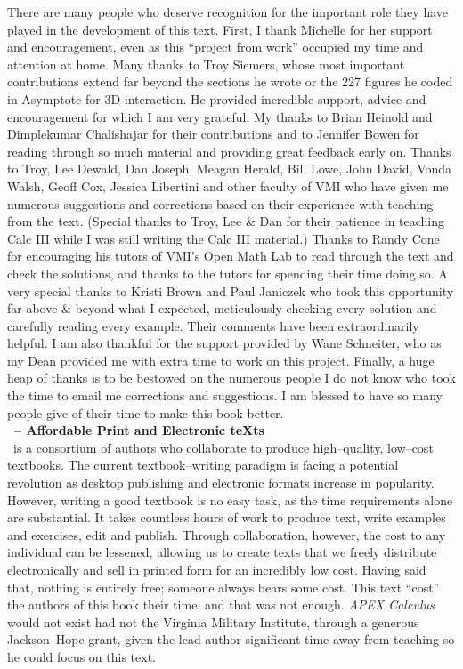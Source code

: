 There are many people who deserve recognition for the important role they have played in the development of this text. First, I thank Michelle for her support and encouragement, even as this ``project from work'' occupied my time and attention at home. Many thanks to Troy Siemers, whose most important contributions extend far beyond the sections he wrote or the 227 figures he coded in Asymptote for 3D interaction.  He provided incredible support, advice and encouragement for which I am very grateful. My thanks to Brian Heinold and Dimplekumar Chalishajar for their contributions and to Jennifer Bowen for reading through so much material and providing great feedback early on. Thanks to Troy, Lee Dewald, Dan Joseph, Meagan Herald, Bill Lowe, John David, Vonda Walsh, Geoff Cox, Jessica Libertini and other faculty of VMI who have given me numerous suggestions and corrections based on their experience with teaching from the text. (Special thanks to Troy, Lee \& Dan for their patience in teaching Calc III while I was still writing the Calc III material.) Thanks to Randy Cone for encouraging his tutors of VMI's Open Math Lab to read through the text and check the solutions, and thanks to the tutors for spending their time doing so. A very special thanks to Kristi Brown and Paul Janiczek who took this opportunity far above \& beyond what I expected, meticulously checking every solution and carefully reading every example. Their comments have been extraordinarily helpful. I am also thankful for the support provided by Wane Schneiter, who as my Dean provided me with extra time to work on this project. Finally, a huge heap of thanks is to be bestowed on the numerous people I do not know who took the time to email me corrections and suggestions. I am blessed to have so many people give of their time to make this book better.\\

\clearpage
\noindent\textbf{\large \apex\  -- Affordable Print and Electronic teXts}\\

\apex\ is a consortium of authors  who collaborate to produce high--quality, low--cost textbooks. The current textbook--writing paradigm is facing a potential revolution as desktop publishing and electronic formats increase in popularity. However, writing a good textbook is no easy task, as the time requirements alone are substantial. It takes countless hours of work to produce text, write examples and exercises, edit and publish. Through collaboration, however, the cost to any individual can be lessened, allowing us to create texts that we freely distribute electronically and sell in printed form for an incredibly low cost. Having said that, nothing is entirely free; someone always bears some cost. This text ``cost'' the authors of this book their time, and that was not enough. \textit{APEX Calculus} would not exist had not the Virginia Military Institute, through a generous Jackson--Hope grant, given the lead author significant time away from teaching so he could focus on this text.

